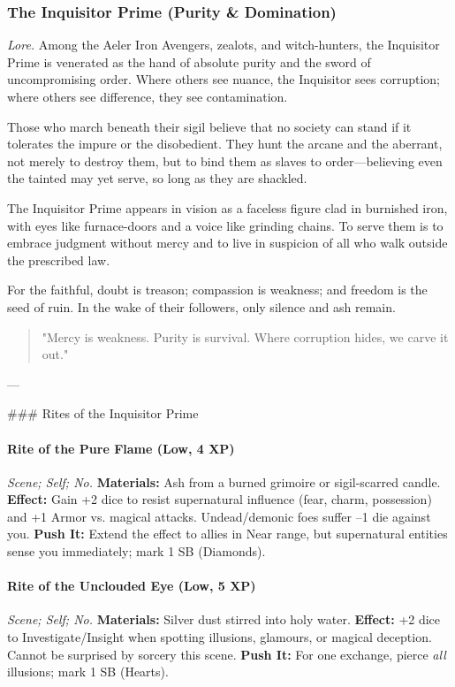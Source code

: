 
\subsubsection{The Inquisitor Prime (Purity \& Domination)}
\textit{Lore.} Among the Aeler Iron Avengers, zealots, and witch-hunters, the Inquisitor Prime is venerated as the hand of absolute purity and the sword of uncompromising order. Where others see nuance, the Inquisitor sees corruption; where others see difference, they see contamination.  

Those who march beneath their sigil believe that no society can stand if it tolerates the impure or the disobedient. They hunt the arcane and the aberrant, not merely to destroy them, but to bind them as slaves to order—believing even the tainted may yet serve, so long as they are shackled.  

The Inquisitor Prime appears in vision as a faceless figure clad in burnished iron, with eyes like furnace-doors and a voice like grinding chains. To serve them is to embrace judgment without mercy and to live in suspicion of all who walk outside the prescribed law.  

For the faithful, doubt is treason; compassion is weakness; and freedom is the seed of ruin. In the wake of their followers, only silence and ash remain.

\begin{quote}
"Mercy is weakness. Purity is survival. Where corruption hides, we carve it out."
\end{quote}

---

### Rites of the Inquisitor Prime

\paragraph*{Rite of the Pure Flame (Low, 4 XP)} \emph{Scene; Self; No.}  
\textbf{Materials:} Ash from a burned grimoire or sigil-scarred candle.  
\textbf{Effect:} Gain +2 dice to resist supernatural influence (fear, charm, possession) and +1 Armor vs. magical attacks. Undead/demonic foes suffer –1 die against you.  
\textbf{Push It:} Extend the effect to allies in Near range, but supernatural entities sense you immediately; mark 1 SB (Diamonds).  

\paragraph*{Rite of the Unclouded Eye (Low, 5 XP)} \emph{Scene; Self; No.}  
\textbf{Materials:} Silver dust stirred into holy water.  
\textbf{Effect:} +2 dice to Investigate/Insight when spotting illusions, glamours, or magical deception. Cannot be surprised by sorcery this scene.  
\textbf{Push It:} For one exchange, pierce \emph{all} illusions; mark 1 SB (Hearts).  

